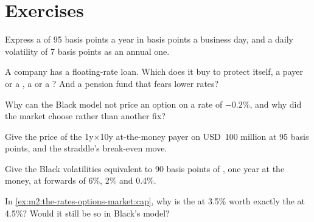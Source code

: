 \section{Exercises}

\begin{exercise}[$\star$]\label{exo:m2:the-rates-options-market:1}
Express a  of 95 basis points a year in basis points a
business day, and a daily volatility of 7 basis points as an annual one.
\end{exercise}

\begin{exercise}[$\star$]\label{exo:m2:the-rates-options-market:2}
A company has a floating-rate loan. Which does it buy to protect itself, a payer
or a , a  or a ? And a pension fund that fears lower
rates?
\end{exercise}

\begin{exercise}[$\star$]\label{exo:m2:the-rates-options-market:3}
Why can the Black model not price an option on a rate of $-0.2\%$, and why
did the market choose  rather than another fix?
\end{exercise}

\begin{exercise}[$\star\star$]\label{exo:m2:the-rates-options-market:4}
Give the price of the 1y$\times$10y at-the-money payer on USD~100 million at
95 basis points, and the straddle's break-even move.
\end{exercise}

\begin{exercise}[$\star\star$]\label{exo:m2:the-rates-options-market:5}
Give the Black volatilities equivalent to 90 basis points of ,
one year at the money, at forwards of 6\%, 2\% and 0.4\%.
\end{exercise}

\begin{exercise}[$\star\star$]\label{exo:m2:the-rates-options-market:6}
In \cref{ex:m2:the-rates-options-market:cap}, why is the  at 3.5\% worth
exactly the  at 4.5\%? Would it still be so in Black's model?
\end{exercise}

